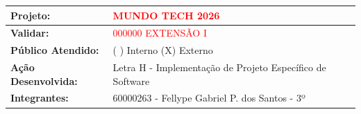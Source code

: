 \documentclass[12pt,a4paper]{article}
\begin{document}
\vspace*{0.2cm plus 0.1cm minus 0.9cm}


\begin{tabularx}{\textwidth}{|p{5cm}|X|}
\hline
\textbf{Projeto:} & \textcolor{red}{MUNDO TECH 2026} \\
\hline
\textbf{Validar:} & \textcolor{red}{000000 EXTENSÃO I} \\
\hline
\textbf{Público Atendido:} & ( ) Interno \quad (X) Externo \\
\hline
\textbf{Ação Desenvolvida:} & Letra H - Implementação de Projeto Específico de Software \\
\hline
\textbf{Integrantes:} &
60000263 - Fellype Gabriel P. dos Santos - 3º


\end{tabularx}
\end{document}

